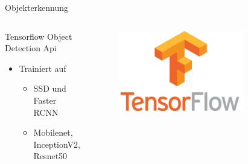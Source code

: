 \begin{frame}{Objekterkennung}
{\begin{columns}[T]
\begin{block}{Tensorflow Object Detection Api}
            \begin{itemize}
                \item Trainiert auf
                \begin{itemize}
                    \item SSD und Faster RCNN
                    \item Mobilenet, InceptionV2, Resnet50
                \end{itemize}
            \end{itemize}
        \end{block}

            \begin{figure}
                \centering
                \includegraphics[width=0.75\textwidth]{Bilder/tf_icon.png}
            \end{figure}
        \end{columns}
        }

\end{frame}



